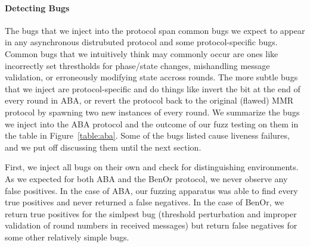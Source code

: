 \paragraph{Detecting Bugs}
The bugs that we inject into the protocol span common bugs we expect to appear
in any asynchronous distrubuted protocol and some protocol-specific bugs.
Common bugs that we intuitively think may commonly occur are ones like
incorrectly set threstholds for phase/state changes, mishandling message
validation, or erroneously modifying state accross rounds.  The more subtle
bugs that we inject are protocol-specific and do things like invert the
 bit at the end of every round in ABA, or revert the protocol
back to the original (flawed) MMR protocol by spawning two new instances of
 every round.  We summarize the bugs we inject into the ABA
protocol and the outcome of our fuzz testing on them in the table in
Figure~\ref{table:aba}. Some of the bugs listed cause liveness failures, and we
put off discussing them until the next section.

First, we inject all bugs on their own and check for distinguishing
environments.  As we expected for both ABA and the BenOr protocol, we never
observe any false positives.  In the case of ABA, our fuzzing apparatus was
able to find every true positives and never returned a false negatives.  In the
case of BenOr, we return true positives for the simlpest bug (threshold
perturbation and improper validation of round numbers in received messages) but
return false negatives for some other relatively simple bugs.

